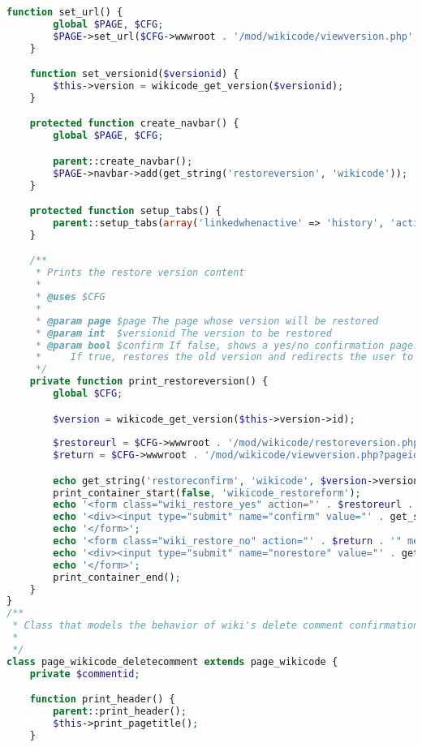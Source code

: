 \begin{lstlisting}[language=PHP]
    function set_url() {
        global $PAGE, $CFG;
        $PAGE->set_url($CFG->wwwroot . '/mod/wikicode/viewversion.php', array('pageid' => $this->page->id, 'versionid' => $this->version->id));
    }

    function set_versionid($versionid) {
        $this->version = wikicode_get_version($versionid);
    }

    protected function create_navbar() {
        global $PAGE, $CFG;

        parent::create_navbar();
        $PAGE->navbar->add(get_string('restoreversion', 'wikicode'));
    }

    protected function setup_tabs() {
        parent::setup_tabs(array('linkedwhenactive' => 'history', 'activetab' => 'history'));
    }

    /**
     * Prints the restore version content
     *
     * @uses $CFG
     *
     * @param page $page The page whose version will be restored
     * @param int  $versionid The version to be restored
     * @param bool $confirm If false, shows a yes/no confirmation page.
     *     If true, restores the old version and redirects the user to the 'view' tab.
     */
    private function print_restoreversion() {
        global $CFG;

        $version = wikicode_get_version($this->version->id);
		
        $restoreurl = $CFG->wwwroot . '/mod/wikicode/restoreversion.php?confirm=1&pageid=' . $this->page->id . '&versionid=' . $version->id . '&sesskey=' . sesskey();
        $return = $CFG->wwwroot . '/mod/wikicode/viewversion.php?pageid=' . $this->page->id . '&versionid=' . $version->id;

        echo get_string('restoreconfirm', 'wikicode', $version->version);
        print_container_start(false, 'wikicode_restoreform');
        echo '<form class="wiki_restore_yes" action="' . $restoreurl . '" method="post" id="restoreversion">';
        echo '<div><input type="submit" name="confirm" value="' . get_string('yes') . '" /></div>';
        echo '</form>';
        echo '<form class="wiki_restore_no" action="' . $return . '" method="post">';
        echo '<div><input type="submit" name="norestore" value="' . get_string('no') . '" /></div>';
        echo '</form>';
        print_container_end();
    }
}
/**
 * Class that models the behavior of wiki's delete comment confirmation page
 *
 */
class page_wikicode_deletecomment extends page_wikicode {
    private $commentid;

    function print_header() {
        parent::print_header();
        $this->print_pagetitle();
    }


\end{lstlisting}
